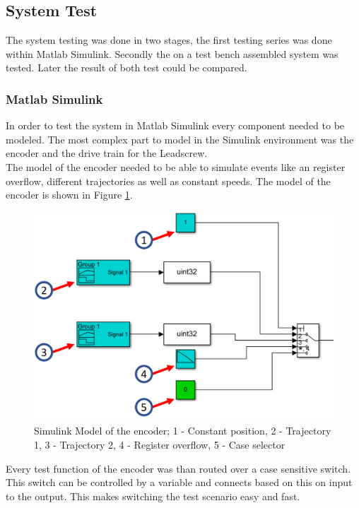 \subsection{System Test}
The system testing was done in two stages, the first testing series was done within Matlab Simulink. Secondly the on a test bench assembled system was tested. Later the result of both test could be compared.

\subsubsection{Matlab Simulink}
In order to test the system in Matlab Simulink every component needed to be modeled. The most complex part to model in the Simulink environment was the encoder and the drive train for the Leadscrew.\\
The model of the encoder needed to be able to simulate events like an register overflow, different trajectories as well as constant speeds. The model of the encoder is shown in Figure \ref{SysEnc}.

\begin{figure}
    \begin{center}
    \includegraphics[width=12cm]{Pictures/SysEnc.png}
    \caption[Simulink Model of the encoder]{Simulink Model of the encoder; 1 - Constant position, 2 - Trajectory 1, 3 - Trajectory 2, 4 - Register overflow, 5 - Case selector}
    \label{SysEnc}
    \end{center}
\end{figure}

Every test function of the encoder was than routed over a case sensitive switch. This switch can be controlled by a variable and connects based on this on input to the output. This makes switching the test scenario easy and fast.\\

